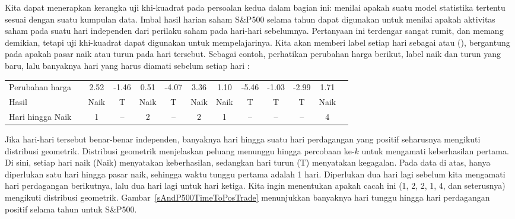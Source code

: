 Kita dapat menerapkan kerangka uji khi-kuadrat pada
persoalan kedua dalam bagian ini:
menilai apakah suatu model statistika tertentu sesuai dengan
suatu kumpulan data.
Imbal hasil harian saham S\&P500 selama \spyears{} tahun dapat digunakan untuk menilai apakah aktivitas saham pada suatu hari independen dari perilaku saham pada hari-hari sebelumnya. Pertanyaan ini terdengar sangat rumit, dan memang demikian, tetapi uji khi-kuadrat dapat digunakan untuk mempelajarinya. Kita akan memberi label setiap hari sebagai  atau  (), bergantung pada apakah pasar naik atau turun pada hari tersebut. Sebagai contoh, perhatikan perubahan harga berikut, label naik dan turun yang baru, lalu banyaknya hari yang harus diamati sebelum setiap hari :
\begin{center}\footnotesize
\begin{tabular}{lc ccc ccc ccc cc}
Perubahan harga		&\hspace{-1mm}	& \footnotesize2.52 &
	\footnotesize-1.46 & \footnotesize 0.51 &
	\footnotesize-4.07 & \footnotesize3.36 &
	\footnotesize1.10 &
	\footnotesize-5.46 & \footnotesize-1.03 & \footnotesize-2.99 & \footnotesize1.71 \\
Hasil	 & \hspace{-1mm} &
	Naik &
	T & Naik &
	T & Naik &
	Naik &
	T & T & T & Naik \\
\footnotesize Hari hingga Naik & \hspace{-1mm} & 1 & -- & 2 & -- & 2 & 1 & -- & -- & -- & 4 \\
\end{tabular}
\end{center}
Jika hari-hari tersebut benar-benar independen, banyaknya hari hingga suatu hari perdagangan yang positif seharusnya mengikuti distribusi geometrik. Distribusi geometrik menjelaskan peluang menunggu hingga percobaan ke-$k$ untuk mengamati keberhasilan pertama. Di sini, setiap hari naik (Naik) menyatakan keberhasilan, sedangkan hari turun (T) menyatakan kegagalan. Pada data di atas, hanya diperlukan satu hari hingga pasar naik, sehingga waktu tunggu pertama adalah 1 hari. Diperlukan dua hari lagi sebelum kita mengamati hari perdagangan  berikutnya, lalu dua hari lagi untuk hari  ketiga. Kita ingin menentukan apakah cacah ini (1, 2, 2, 1, 4, dan seterusnya) mengikuti distribusi geometrik. Gambar~\ref{sAndP500TimeToPosTrade} menunjukkan banyaknya hari tunggu hingga hari perdagangan positif selama \spyears{} tahun untuk S\&P500.

